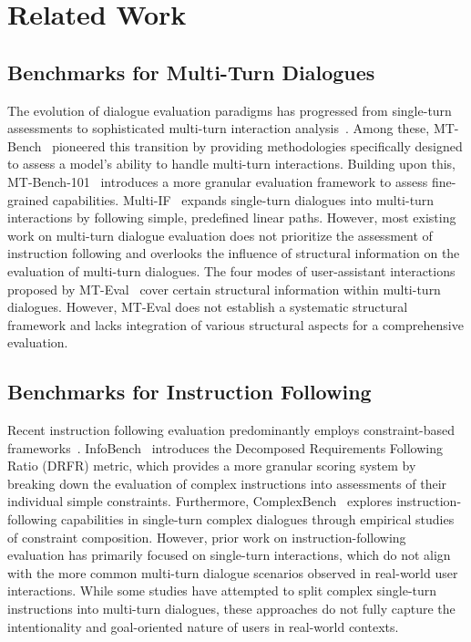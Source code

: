 \section{Related Work}

\subsection{Benchmarks for Multi-Turn Dialogues}
The evolution of dialogue evaluation paradigms has progressed from single-turn assessments to sophisticated multi-turn interaction analysis~\cite{wang2023mint,sun-etal-2024-parrot,duan-etal-2024-botchat}. 
Among these, MT-Bench~\cite{zheng2023judging} pioneered this transition by providing methodologies specifically designed to assess a model's ability to handle multi-turn interactions. 
Building upon this, MT-Bench-101~\cite{bai-etal-2024-mt} introduces a more granular evaluation framework to assess fine-grained capabilities. 
Multi-IF~\cite{he2024multi} expands single-turn dialogues into multi-turn interactions by following simple, predefined linear paths.
However, most existing work on multi-turn dialogue evaluation does not prioritize the assessment of instruction following and overlooks the influence of structural information on the evaluation of multi-turn dialogues.
The four modes of user-assistant interactions proposed by MT-Eval~\cite{kwan-etal-2024-mt} cover certain structural information within multi-turn dialogues.
However, MT-Eval does not establish a systematic structural framework and lacks integration of various structural aspects for a comprehensive evaluation.


\subsection{Benchmarks for Instruction Following}
Recent instruction following evaluation predominantly employs constraint-based frameworks~\cite{jiang-etal-2024-followbench,zhang2024cfbench,he2024can,zhou2023instruction}.
InfoBench~\cite{qin2024infobench} introduces the Decomposed Requirements Following Ratio (DRFR) metric, which provides a more granular scoring system by breaking down the evaluation of complex instructions into assessments of their individual simple constraints. 
Furthermore, ComplexBench~\cite{wen2024benchmarking} explores instruction-following capabilities in single-turn complex dialogues through empirical studies of constraint composition.
However, prior work on instruction-following evaluation has primarily focused on single-turn interactions, which do not align with the more common multi-turn dialogue scenarios observed in real-world user interactions. 
While some studies have attempted to split complex single-turn instructions into multi-turn dialogues, these approaches do not fully capture the intentionality and goal-oriented nature of users in real-world contexts.